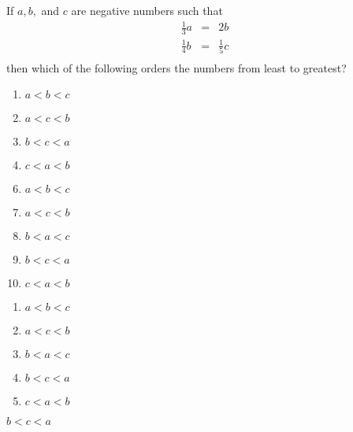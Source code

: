 

  If $a,b,$ and $c$ are negative numbers such that
\[\begin{array}{ccc}\frac{1}{3}a&=&2b\\[2mm]
\frac{1}{4}b&=&\frac{1}{5}c\\
\end{array}\]
then which of the following orders the numbers from least to greatest?


\ifsat
	\begin{enumerate}[label=\Alph*)]
		\item    $a<b<c$ 
		\item  $a<c<b$ 
		\item $b<c<a$ %
		\item  $c<a<b$ 
	\end{enumerate}
\else
\fi

\ifacteven
	\begin{enumerate}[label=\textbf{\Alph*.},itemsep=\fill,align=left]
		\setcounter{enumii}{5}
		\item    $a<b<c$ 
		\item  $a<c<b$ 
		\item $b<a<c$
		\addtocounter{enumii}{1}
		\item $b<c<a$ %
		\item  $c<a<b$ 
	\end{enumerate}
\else
\fi

\ifactodd
	\begin{enumerate}[label=\textbf{\Alph*.},itemsep=\fill,align=left]
		\item    $a<b<c$ 
		\item  $a<c<b$ 
		\item $b<a<c$
		\item $b<c<a$ %
		\item  $c<a<b$ 
	\end{enumerate}
\else
\fi

\ifgridin
 $b<c<a$ %
		
\else
\fi


